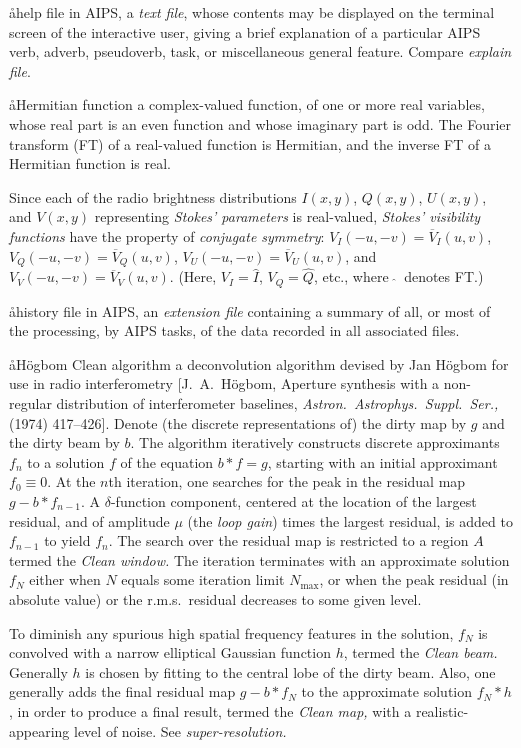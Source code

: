 \aa{help file}
in AIPS, a {\it text file}, whose contents may be displayed
on the terminal screen of the interactive user,
giving a brief explanation of a particular AIPS verb, adverb,
pseudoverb, task, or miscellaneous general feature.
Compare {\it explain file}.

\aa{Hermitian function}
a complex-valued function, of one or more real variables,
whose real part is an even function and whose imaginary part is odd.
The Fourier transform (FT) of a real-valued function is Hermitian,
and the inverse FT of a Hermitian function is real.
\par
Since each of the radio brightness distributions
$I(x,y)$, $Q(x,y)$, $U(x,y)$, and $V(x,y)$
representing {\it Stokes' parameters}
is real-valued,
{\it Stokes' visibility functions} have the property
of {\it conjugate symmetry}\/:
$V_I(-u,-v)=\overline V_I(u,v)$,
$V_Q(-u,-v)=\overline V_Q(u,v)$,
$V_U(-u,-v)=\overline V_U(u,v)$,
and $V_V(-u,-v)=\overline V_V(u,v)$.
(Here, $V_I=\hat I$, $V_Q=\hat Q$, etc., where $\ \hat {}\ $ denotes FT.)

\aa{history file}
in AIPS, an {\it extension file} containing a summary
of all, or most of the processing, by AIPS tasks, of the data recorded
in all associated files.

\aa{H\"ogbom Clean algorithm}
a deconvolution algorithm
devised by Jan H\"ogbom for use in radio interferometry
[J.~A.~H\"ogbom, Aperture synthesis with a non-regular
distribution of interferometer baselines, {\it Astron.\ Astrophys.\
Suppl.\ Ser.,}  (1974) 417--426].
Denote (the discrete representations of) the dirty map by $g$
and the dirty beam by $b$.
The algorithm iteratively constructs discrete approximants $f_n$
to a solution $f$ of the equation $b\ast f=g$,
starting with an initial approximant $f_0\equiv0$.
At the $n$th iteration, one searches for the peak in the
residual map $g-b\ast f_{n-1}$.
A $\delta$-function component, centered at the location of the largest
residual, and of amplitude $\mu$ (the {\it loop gain}\/)
times the largest residual, is added to $f_{n-1}$ to yield $f_n$.
The search over the residual map is restricted to a region $A$
termed the {\it Clean window.}
The iteration terminates with an approximate solution $f_N$
either when $N$ equals some iteration limit $N_{\operatorname{max}}$,
or when the peak residual (in absolute value) or the r.m.s.\
residual decreases to some given level.
\par
To diminish any spurious high spatial frequency features in
the solution, $f_N$ is convolved with a narrow elliptical Gaussian
function $h$, termed the {\it Clean beam.}
Generally $h$ is chosen by fitting to the central lobe of the
dirty beam.
Also, one generally adds the final residual map $g-b\ast f_N$
to the approximate solution $f_N\ast h$, in order to produce
a final result, termed the {\it Clean map,} with a
realistic-appearing level of noise.
See {\it super-resolution.}

